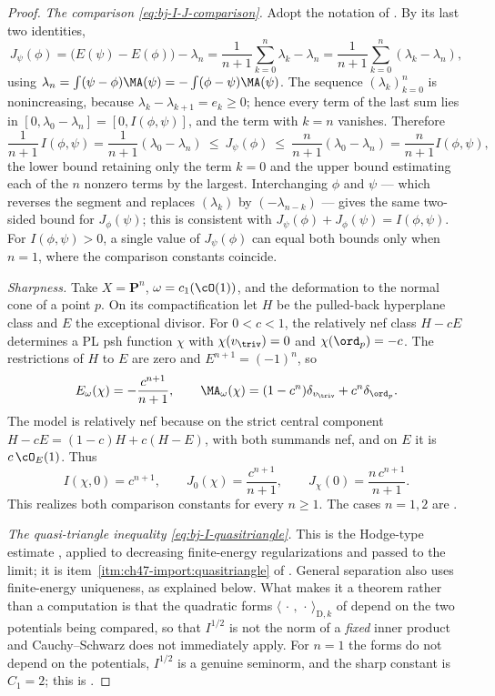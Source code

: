 \begin{proof}
\emph{The comparison \eqref{eq:bj-I-J-comparison}.}  Adopt the notation of
.  By its last two identities,
\[
 J_\psi(\phi)=\bigl(E(\psi)-E(\phi)\bigr)-\lambda_n
 =\frac1{n+1}\sum_{k=0}^{n}\lambda_k-\lambda_n
 =\frac1{n+1}\sum_{k=0}^{n}(\lambda_k-\lambda_n),
\]
using $\lambda_n=\int(\psi-\phi)\MA(\psi)=-\int(\phi-\psi)\MA(\psi)$.
The sequence $(\lambda_k)_{k=0}^n$ is nonincreasing, because
$\lambda_k-\lambda_{k+1}=e_k\ge0$; hence every term of the last sum lies
in $[0,\lambda_0-\lambda_n]=[0,I(\phi,\psi)]$, and the term with
$k=n$ vanishes.  Therefore
\[
 \frac{1}{n+1}\,I(\phi,\psi)
 =\frac{1}{n+1}(\lambda_0-\lambda_n)
 \ \le\ J_\psi(\phi)\ \le\ \frac{n}{n+1}(\lambda_0-\lambda_n)
 =\frac{n}{n+1}I(\phi,\psi),
\]
the lower bound retaining only the term $k=0$ and the upper bound
estimating each of the $n$ nonzero terms by the largest.  Interchanging
$\phi$ and $\psi$ --- which reverses the segment and replaces
$(\lambda_k)$ by $(-\lambda_{n-k})$ --- gives the same two-sided bound
for $J_\phi(\psi)$; this is consistent with
$J_\psi(\phi)+J_\phi(\psi)=I(\phi,\psi)$. For $I(\phi,\psi)>0$, a single value of $J_\psi(\phi)$ can equal both
bounds only when $n=1$, where the comparison constants coincide.

\emph{Sharpness.}
Take $X=\mathbf P^n$, $\omega=c_1(\cO(1))$, and the deformation to
the normal cone of a point $p$. On its compactification let $H$
be the pulled-back hyperplane class and $E$ the exceptional divisor.
For $0<c<1$, the relatively nef class $H-cE$ determines a PL
psh function $\chi$ with $\chi(v_{\triv})=0$ and
$\chi(\ord_p)=-c$. The restrictions of $H$ to $E$ are zero and
$E^{n+1}=(-1)^n$, so
\[
 E_\omega(\chi)=-\frac{c^{n+1}}{n+1},
 \qquad
 \MA_\omega(\chi)=(1-c^n)\delta_{v_{\triv}}+c^n\delta_{\ord_p}.
\]
The model is relatively nef because on the strict central component
$H-cE=(1-c)H+c(H-E)$, with both summands nef, and on $E$ it is
$c\,\cO_E(1)$. Thus
\[
 I(\chi,0)=c^{n+1},\qquad
 J_0(\chi)=\frac{c^{n+1}}{n+1},\qquad
 J_\chi(0)=\frac{n\,c^{n+1}}{n+1}.
\]
This realizes both comparison constants for every $n\ge1$.
The cases $n=1,2$ are
.

\emph{The quasi-triangle inequality \eqref{eq:bj-I-quasitriangle}.}  This
is the Hodge-type estimate \cite[Theorem~3.31]{BJ22}, applied to decreasing
finite-energy regularizations and passed to the limit; it is
item~\cref{itm:ch47-import:quasitriangle} of .
General separation also uses finite-energy uniqueness, as explained below.  What makes it
a theorem rather than a computation is that the quadratic forms
$\langle\,\cdot\,,\,\cdot\,\rangle_{\mathrm D,k}$ of
 depend on the two potentials being
compared, so that $I^{1/2}$ is not the norm of a \emph{fixed} inner
product and Cauchy--Schwarz does not immediately apply.  For $n=1$ the
forms do not depend on the potentials, $I^{1/2}$ is a genuine seminorm,
and the sharp constant is $C_1=2$; this is
.


\end{proof}
